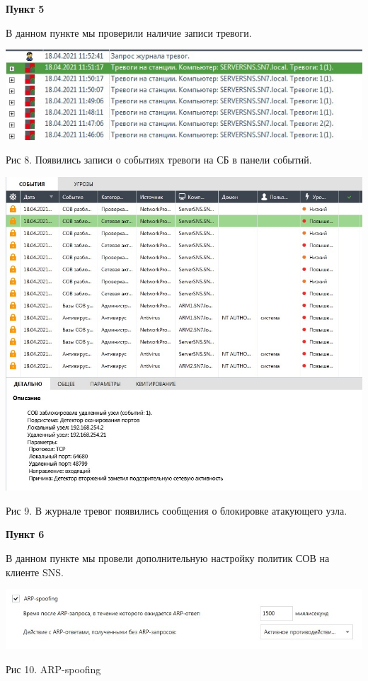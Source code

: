 \documentclass[a4paper,14pt]{extarticle}
\begin{document}
    \textbf{Пункт 5}
    \vspace{-3ex}
    \begin{center}
        \singlespacing
        В данном пункте мы проверили наличие записи тревоги. 

        \includegraphics[scale=0.6]{pics/5_1.jpg}

        Рис 8. Появились записи о событиях тревоги на СБ в панели событий.

        \includegraphics[scale=0.45]{pics/5_2.jpg}

        Рис 9. В журнале тревог появились сообщения о блокировке атакующего узла.

    \end{center}

    \newpage
    \textbf{Пункт 6}
    \vspace{-3ex}
    \begin{center}
        \singlespacing
        В данном пункте мы провели дополнительную настройку политик СОВ на клиенте SNS.

        \includegraphics[scale=0.6]{pics/6.jpg}

        Рис 10. ARP-spoofing
    \end{center}
\end{document}

